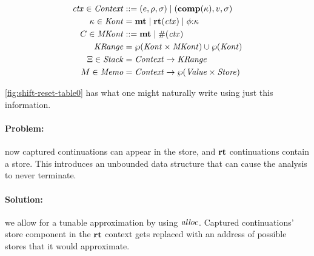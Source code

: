 \begin{align*}
  \mathit{ctx} \in \mathit{Context} &::= (e,\rho,\sigma) \mathrel{\mid} (\mathbf{comp}(\kappa),v,\sigma) \\
  \kappa \in \mathit{Kont} &= \mathbf{mt} \mathrel{\mid} \mathbf{rt}(\mathit{ctx}) \mathrel{\mid} \phi{\tt :} \kappa \\
  C \in \mathit{MKont} &::= \mathbf{mt} \mathrel{\mid} \#(\mathit{ctx}) \\
  \mathit{KRange} &= \wp(\mathit{Kont} \times \mathit{MKont}) \cup \wp(\mathit{Kont}) \\
  \Xi \in \mathit{Stack} &= \mathit{Context} \to \mathit{KRange} \\
  M \in \mathit{Memo} &= \mathit{Context} \to \wp(\mathit{Value} \times \mathit{Store})
\end{align*}

\autoref{fig:shift-reset-table0} has what one might naturally write using just this information.
%
\paragraph{Problem:} now captured continuations can appear in the store, and $\mathbf{rt}$ continuations contain a store.
%
This introduces an unbounded data structure that can cause the analysis to never terminate.

\paragraph{Solution:} we allow for a tunable approximation by using $\mathit{alloc}$.
%
Captured continuations' store component in the $\mathbf{rt}$ context gets replaced with an address of possible stores that it would approximate.


